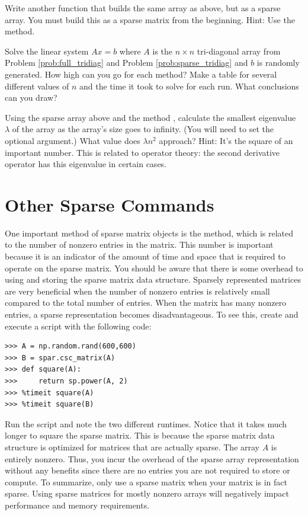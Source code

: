 \begin{problem}
Write another function that builds the same array as above, but as a sparse array.
You must build this as a sparse matrix from the beginning.
Hint: Use the  method.
\label{prob:sparse_tridiag}
\end{problem}

\begin{problem}
Solve the linear system $Ax = b$ where $A$ is the $n\times n$
tri-diagonal array from Problem \ref{prob:full_tridiag} and Problem \ref{prob:sparse_tridiag} and $b$ is randomly
generated.  How high can you go for each method?  Make a table for
several different values of $n$ and the time it took to solve for
each run.  What conclusions can you draw?
\end{problem}

\begin{problem}
Using the sparse array above and the method ,
calculate the smallest eigenvalue $\lambda$ of the array as the array's size goes to infinity. (You will need to set the  optional argument.)
What value does $\lambda n^2$ approach?
Hint: It's the square of an important number.
This is related to operator theory: the second derivative operator has this eigenvalue in certain cases.
\end{problem}

\section*{Other Sparse Commands}
One important method of sparse matrix objects is the  method,
which is related to the number of nonzero entries in the matrix.
This number is important because it is an indicator of the amount of time and space
that is required to operate on the sparse matrix.
You should be aware that there is some overhead to using and storing the sparse matrix data structure.
Sparsely represented matrices are very beneficial when the number of
nonzero entries is relatively small compared to the total number of entries.
When the matrix has many nonzero entries, a sparse representation becomes disadvantageous.
To see this, create and execute a script with the following code:
\begin{lstlisting}
>>> A = np.random.rand(600,600)
>>> B = spar.csc_matrix(A)
>>> def square(A):
>>>     return sp.power(A, 2)
>>> %timeit square(A)
>>> %timeit square(B)
\end{lstlisting}
Run the script and note the two different runtimes.
Notice that it takes much longer to square the sparse matrix.
This is because the sparse matrix data structure is optimized for matrices that are actually sparse.
The array $A$ is entirely nonzero.
Thus, you incur the overhead of the sparse array representation without any
benefits since there are no entries you are not required to store or compute.
To summarize, only use a sparse matrix when your matrix is in fact sparse.
Using sparse matrices for mostly nonzero arrays will negatively impact performance and memory requirements.

